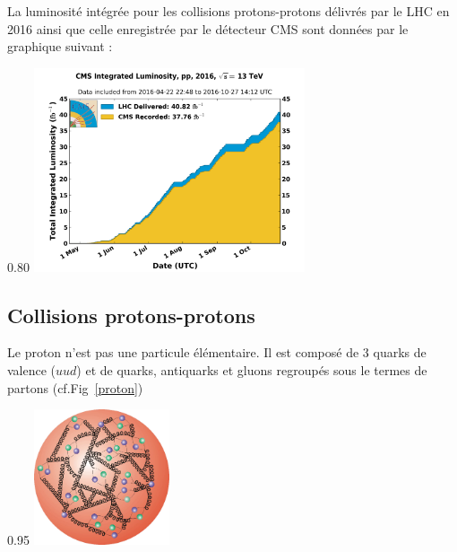 La luminosité intégrée pour les collisions protons-protons délivrés par le LHC en \num{2016} ainsi que celle enregistrée par le détecteur CMS sont données par le graphique suivant :

\begin{minipagewithmarginpars}[ht!]{0.80\textwidth}
\centering
\includegraphics[width=0.6\textwidth]{LHC/luminosity.png}
\end{minipagewithmarginpars}

\subsection{Collisions protons-protons}
Le proton n'est pas une particule élémentaire. Il est composé de \num{3} quarks de valence ($uud$) et de quarks, antiquarks et gluons regroupés sous le termes de partons (cf.Fig~\ref{proton})

\begin{minipagewithmarginpars}[ht!]{0.95\textwidth}
\centering
\includegraphics[width=0.3\textwidth]{SM/quarks3.png}
\label{proton}	
\end{minipagewithmarginpars}

